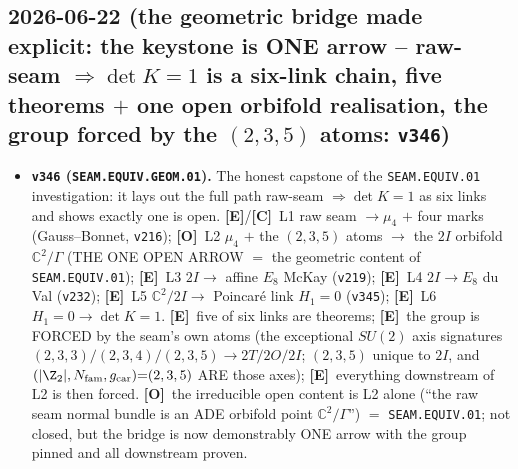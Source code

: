 \documentclass[11pt]{article}
\providecommand{\mE}{\textbf{[E]}}\providecommand{\mC}{\textbf{[C]}}
\providecommand{\mO}{\textbf{[O]}}\providecommand{\mX}{\textbf{[X]}}
\providecommand{\vref}[1]{\texttt{#1}}
\providecommand{\gcar}{g_{\mathrm{car}}}\providecommand{\Nfam}{N_{\mathrm{fam}}}
\begin{document}
\subsection*{2026-06-22 (the geometric bridge made explicit: the keystone is ONE arrow -- raw-seam $\Rightarrow\det K{=}1$ is a six-link chain, five theorems $+$ one open orbifold realisation, the group forced by the $(2,3,5)$ atoms: \texttt{v346})}
\begin{itemize}
\item \textbf{\texttt{v346} (\texttt{SEAM.EQUIV.GEOM.01}).} The honest capstone of the \texttt{SEAM.EQUIV.01}
investigation: it lays out the full path raw-seam $\Rightarrow\det K{=}1$ as six links and shows exactly one is open.
\mE/\mC\ L1 raw seam $\to\mu_4$ $+$ four marks (Gauss--Bonnet, \vref{v216}); \mO\ L2 $\mu_4$ $+$ the $(2,3,5)$ atoms
$\to$ the $2I$ orbifold $\mathbb{C}^2/\Gamma$ (THE ONE OPEN ARROW $=$ the geometric content of \texttt{SEAM.EQUIV.01});
\mE\ L3 $2I\to$ affine $E_8$ McKay (\vref{v219}); \mE\ L4 $2I\to E_8$ du Val (\vref{v232}); \mE\ L5
$\mathbb{C}^2/2I\to$ Poincar\'e link $H_1{=}0$ (\vref{v345}); \mE\ L6 $H_1{=}0\to\det K{=}1$. \mE\ five of six links
are theorems; \mE\ the group is FORCED by the seam's own atoms (the exceptional $SU(2)$ axis signatures
$(2,3,3)/(2,3,4)/(2,3,5)\to 2T/2O/2I$; $(2,3,5)$ unique to $2I$, and $(|\Z_2|,\Nfam,\gcar){=}(2,3,5)$ ARE those
axes); \mE\ everything downstream of L2 is then forced. \mO\ the irreducible open content is L2 alone (``the raw
seam normal bundle is an ADE orbifold point $\mathbb{C}^2/\Gamma$'') $=$ \texttt{SEAM.EQUIV.01}; not closed, but the
bridge is now demonstrably ONE arrow with the group pinned and all downstream proven.
\end{itemize}
\end{document}
